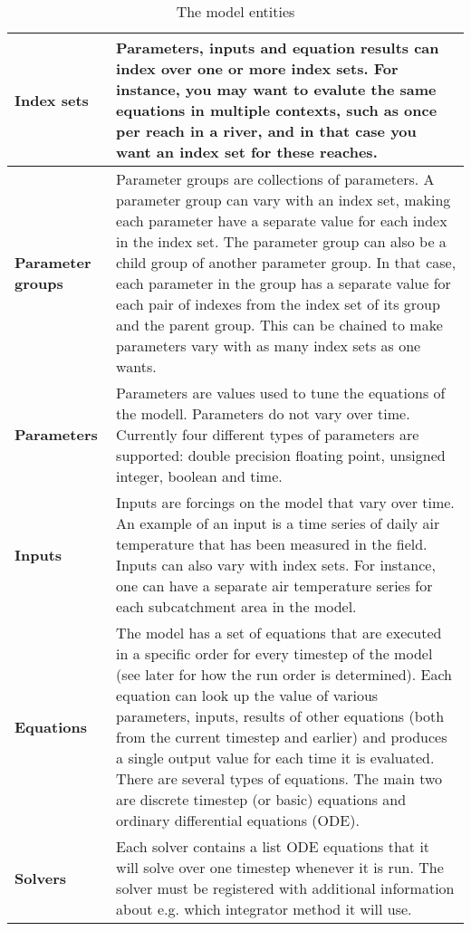 \documentclass[11pt]{article}
\theoremstyle{definition}
\begin{document}
\begin{table}[H]
\centering
\begin{tabular}{|>{\bf}l|p{10cm} |}
\hline
Index sets & Parameters, inputs and equation results can index over one or more index sets. For instance, you may want to evalute the same equations in multiple contexts, such as once per reach in a river, and in that case you want an index set for these reaches. \\
\hline
Parameter groups & Parameter groups are collections of parameters. A parameter group can vary with an index set, making each parameter have a separate value for each index in the index set. The parameter group can also be a child group of another parameter group. In that case, each parameter in the group has a separate value for each pair of indexes from the index set of its group and the parent group. This can be chained to make parameters vary with as many index sets as one wants. \\
\hline
Parameters & Parameters are values used to tune the equations of the modell. Parameters do not vary over time. Currently four different types of parameters are supported: double precision floating point, unsigned integer, boolean and time. \\
\hline
Inputs & Inputs are forcings on the model that vary over time. An example of an input is a time series of daily air temperature that has been measured in the field. Inputs can also vary with index sets. For instance, one can have a separate air temperature series for each subcatchment area in the model.\\
\hline
Equations & The model has a set of equations that are executed in a specific order for every timestep of the model (see later for how the run order is determined). Each equation can look up the value of various parameters, inputs, results of other equations (both from the current timestep and earlier) and produces a single output value for each time it is evaluated. There are several types of equations. The main two are discrete timestep (or basic) equations and ordinary differential equations (ODE). \\
\hline
Solvers & Each solver contains a list ODE equations that it will solve over one timestep whenever it is run. The solver must be registered with additional information about e.g. which integrator method it will use. \\
\hline
\end{tabular}
\caption{The model entities}
\label{tab:modelentity}
\end{table}
\end{document}
